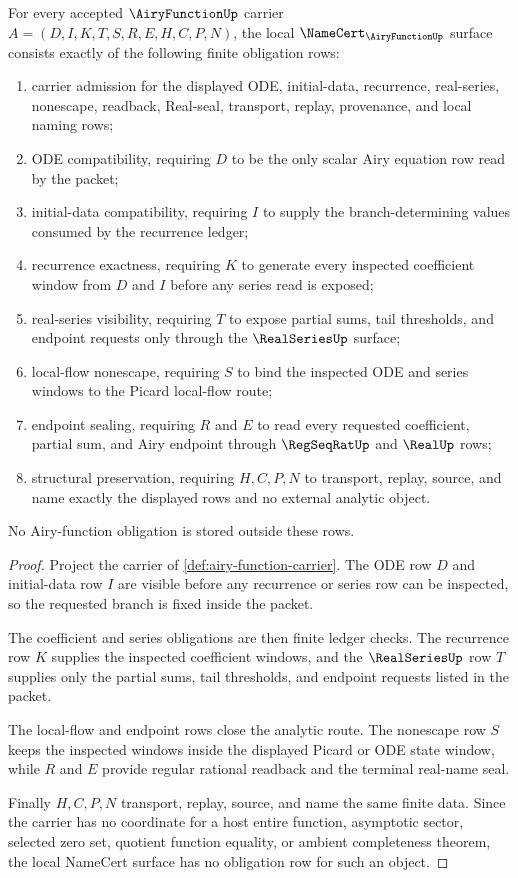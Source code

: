 \begin{theorem}
\label{thm:airy-function-namecert-obligations}
For every accepted $\AiryFunctionUp$ carrier $A=(D,I,K,T,S,R,E,H,C,P,N)$, the local $\NameCert_{\AiryFunctionUp}$ surface consists exactly of the following finite obligation rows:
\begin{enumerate}
\item carrier admission for the displayed ODE, initial-data, recurrence, real-series, nonescape, readback, Real-seal, transport, replay, provenance, and local naming rows;
\item ODE compatibility, requiring $D$ to be the only scalar Airy equation row read by the packet;
\item initial-data compatibility, requiring $I$ to supply the branch-determining values consumed by the recurrence ledger;
\item recurrence exactness, requiring $K$ to generate every inspected coefficient window from $D$ and $I$ before any series read is exposed;
\item real-series visibility, requiring $T$ to expose partial sums, tail thresholds, and endpoint requests only through the $\RealSeriesUp$ surface;
\item local-flow nonescape, requiring $S$ to bind the inspected ODE and series windows to the Picard local-flow route;
\item endpoint sealing, requiring $R$ and $E$ to read every requested coefficient, partial sum, and Airy endpoint through $\RegSeqRatUp$ and $\RealUp$ rows;
\item structural preservation, requiring $H,C,P,N$ to transport, replay, source, and name exactly the displayed rows and no external analytic object.
\end{enumerate}
No Airy-function obligation is stored outside these rows.
\end{theorem}
\begin{proof}
Project the carrier of \autoref{def:airy-function-carrier}. The ODE row $D$ and initial-data row $I$ are visible before any recurrence or series row can be inspected, so the requested branch is fixed inside the packet.

The coefficient and series obligations are then finite ledger checks. The recurrence row $K$ supplies the inspected coefficient windows, and the $\RealSeriesUp$ row $T$ supplies only the partial sums, tail thresholds, and endpoint requests listed in the packet.

The local-flow and endpoint rows close the analytic route. The nonescape row $S$ keeps the inspected windows inside the displayed Picard or ODE state window, while $R$ and $E$ provide regular rational readback and the terminal real-name seal.

Finally $H,C,P,N$ transport, replay, source, and name the same finite data. Since the carrier has no coordinate for a host entire function, asymptotic sector, selected zero set, quotient function equality, or ambient completeness theorem, the local NameCert surface has no obligation row for such an object.
\end{proof}

